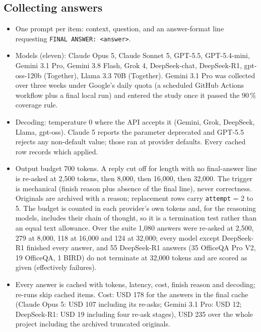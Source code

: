 \documentclass[11pt]{article}
\begin{document}
\subsection{Collecting answers}
\begin{itemize}
\item One prompt per item: context, question, and an answer-format line requesting \texttt{FINAL ANSWER: <answer>}.
\item Models (eleven): Claude Opus 5, Claude Sonnet 5, GPT-5.5, GPT-5.4-mini, Gemini 3.1 Pro, Gemini 3.8 Flash, Grok 4, DeepSeek-chat, DeepSeek-R1, gpt-oss-120b (Together), Llama 3.3 70B (Together). Gemini 3.1 Pro was collected over three weeks under Google's daily quota (a scheduled GitHub Actions workflow plus a final local run) and entered the study once it passed the 90\,\% coverage rule.
\item Decoding: temperature 0 where the API accepts it (Gemini, Grok, DeepSeek, Llama, gpt-oss). Claude 5 reports the parameter deprecated and GPT-5.5 rejects any non-default value; those ran at provider defaults. Every cached row records which applied.
\item Output budget 700 tokens. A reply cut off for length with no final-answer line is re-asked at 2,500 tokens, then 8,000, then 16,000, then 32,000. The trigger is mechanical (finish reason plus absence of the final line), never correctness. Originals are archived with a reason; replacement rows carry \texttt{attempt} = 2 to 5. The budget is counted in each provider's own tokens and, for the reasoning models, includes their chain of thought, so it is a termination test rather than an equal text allowance. Over the suite 1,080 answers were re-asked at 2,500, 279 at 8,000, 118 at 16,000 and 124 at 32,000; every model except DeepSeek-R1 finished every answer, and 55 DeepSeek-R1 answers (35 OfficeQA Pro V2, 19 OfficeQA, 1 BIRD) do not terminate at 32,000 tokens and are scored as given (effectively failures).
\item Every answer is cached with tokens, latency, cost, finish reason and decoding; re-runs skip cached items. Cost: USD 178 for the answers in the final cache (Claude Opus 5: USD 107 including its re-asks; Gemini 3.1 Pro: USD 12; DeepSeek-R1: USD 19 including four re-ask stages), USD 235 over the whole project including the archived truncated originals.
\end{itemize}
\end{document}
